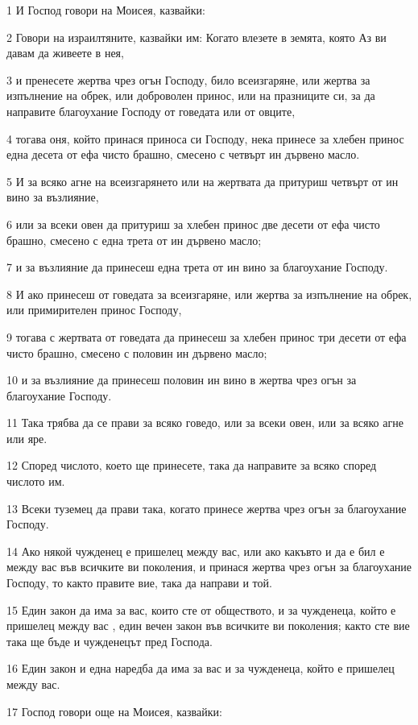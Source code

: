 \par 1 И Господ говори на Моисея, казвайки:
\par 2 Говори на израилтяните, казвайки им: Когато влезете в земята, която Аз ви давам да живеете в нея,
\par 3 и пренесете жертва чрез огън Господу, било всеизгаряне, или жертва за изпълнение на обрек, или доброволен принос, или на празниците си, за да направите благоухание Господу от говедата или от овците,
\par 4 тогава оня, който принася приноса си Господу, нека принесе за хлебен принос една десета от ефа чисто брашно, смесено с четвърт ин дървено масло.
\par 5 И за всяко агне на всеизгарянето или на жертвата да притуриш четвърт от ин вино за възлияние,
\par 6 или за всеки овен да притуриш за хлебен принос две десети от ефа чисто брашно, смесено с една трета от ин дървено масло;
\par 7 и за възлияние да принесеш една трета от ин вино за благоухание Господу.
\par 8 И ако принесеш от говедата за всеизгаряне, или жертва за изпълнение на обрек, или примирителен принос Господу,
\par 9 тогава с жертвата от говедата да принесеш за хлебен принос три десети от ефа чисто брашно, смесено с половин ин дървено масло;
\par 10 и за възлияние да принесеш половин ин вино в жертва чрез огън за благоухание Господу.
\par 11 Така трябва да се прави за всяко говедо, или за всеки овен, или за всяко агне или яре.
\par 12 Според числото, което ще принесете, така да направите за всяко според числото им.
\par 13 Всеки туземец да прави така, когато принесе жертва чрез огън за благоухание Господу.
\par 14 Ако някой чужденец е пришелец между вас, или ако какъвто и да е бил е между вас във всичките ви поколения, и принася жертва чрез огън за благоухание Господу, то както правите вие, така да направи и той.
\par 15 Един закон да има за вас, които сте от обществото, и за чужденеца, който е пришелец между вас , един вечен закон във всичките ви поколения; както сте вие така ще бъде и чужденецът пред Господа.
\par 16 Един закон и една наредба да има за вас и за чужденеца, който е пришелец между вас.
\par 17 Господ говори още на Моисея, казвайки:
